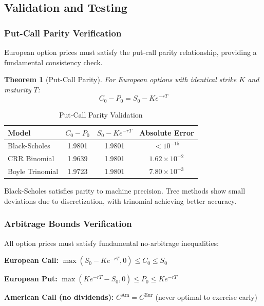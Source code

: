 \documentclass[10pt,twocolumn]{article}
\newtheorem{theorem}{Theorem}
\begin{document}
\subsection{Validation and Testing}

\subsubsection{Put-Call Parity Verification}

European option prices must satisfy the put-call parity relationship, providing a fundamental consistency check.

\begin{theorem}[Put-Call Parity]
For European options with identical strike $K$ and maturity $T$:
\begin{equation}
C_0 - P_0 = S_0 - Ke^{-rT}
\end{equation}
\end{theorem}

\begin{table}[H]
\centering
\caption{Put-Call Parity Validation}
\begin{tabular}{@{}lccc@{}}
\toprule
\textbf{Model} & $C_0 - P_0$ & $S_0 - Ke^{-rT}$ & \textbf{Absolute Error} \\
\midrule
Black-Scholes & 1.9801 & 1.9801 & $< 10^{-15}$ \\
CRR Binomial & 1.9639 & 1.9801 & $1.62 \times 10^{-2}$ \\
Boyle Trinomial & 1.9723 & 1.9801 & $7.80 \times 10^{-3}$ \\
\bottomrule
\end{tabular}
\end{table}

Black-Scholes satisfies parity to machine precision. Tree methods show small deviations due to discretization, with trinomial achieving better accuracy.

\subsubsection{Arbitrage Bounds Verification}

All option prices must satisfy fundamental no-arbitrage inequalities:

\textbf{European Call:} $\max(S_0 - Ke^{-rT}, 0) \leq C_0 \leq S_0$

\textbf{European Put:} $\max(Ke^{-rT} - S_0, 0) \leq P_0 \leq Ke^{-rT}$

\textbf{American Call (no dividends):} $C^{\text{Am}} = C^{\text{Eur}}$ (never optimal to exercise early)
\end{document}
